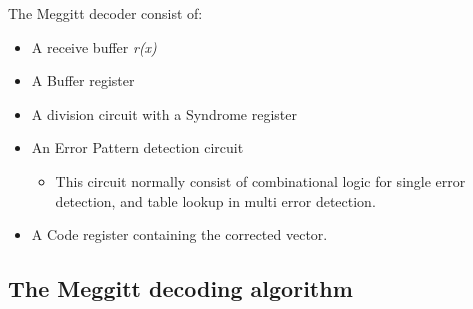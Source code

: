 \documentclass[MiniProjectMain]{subfiles}
\begin{document}
The Meggitt decoder consist of:
\begin{itemize}
\item
A receive buffer \textit{r(x)}

\item
A Buffer register

\item
A division circuit with a Syndrome register

\item
An Error Pattern detection circuit

	\begin{itemize}
	\item This circuit normally consist of combinational logic for single error detection, and table lookup in multi error detection.
	\end{itemize}

\item
A Code register containing the corrected vector.

\end{itemize}

\subsection{The Meggitt decoding algorithm}
\end{document}
